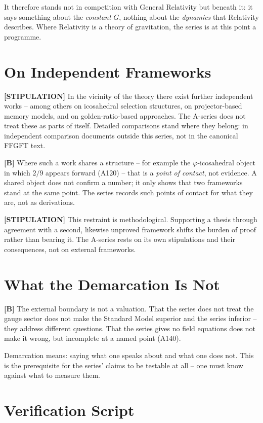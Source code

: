 It therefore stands not in competition with General Relativity but beneath it: it
says something about the \emph{constant} $G$, nothing about the \emph{dynamics}
that Relativity describes. Where Relativity is a theory of gravitation, the series
is at this point a programme.

\section{On Independent Frameworks}

\textbf{[STIPULATION]} In the vicinity of the theory there exist further
independent works -- among others on icosahedral selection structures, on
projector-based memory models, and on golden-ratio-based approaches. The A-series
does not treat these as parts of itself. Detailed comparisons stand where they
belong: in independent comparison documents outside this series, not in the
canonical FFGFT text.

\textbf{[B]} Where such a work shares a structure -- for example the
$\varphi$-icosahedral object in which $2/9$ appears forward (A120) -- that is a
\emph{point of contact}, not evidence. A shared object does not confirm a number;
it only shows that two frameworks stand at the same point. The series records such
points of contact for what they are, not as derivations.

\textbf{[STIPULATION]} This restraint is methodological. Supporting a thesis
through agreement with a second, likewise unproved framework shifts the burden of
proof rather than bearing it. The A-series rests on its own stipulations and their
consequences, not on external frameworks.

\section{What the Demarcation Is Not}

\textbf{[B]} The external boundary is not a valuation. That the series does not
treat the gauge sector does not make the Standard Model superior and the series
inferior -- they address different questions. That the series gives no field
equations does not make it wrong, but incomplete at a named point (A140).

Demarcation means: saying what one speaks about and what one does not. This is the
prerequisite for the series' claims to be testable at all -- one must know against
what to measure them.

\section{Verification Script}

